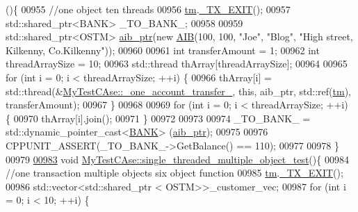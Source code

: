 \begin{DoxyCode}
      ()\{
00955     \textcolor{comment}{//one object ten threads}
00956     \hyperlink{class_my_test_c_ase_a422e6e5d4ddedea384be96031c89b72b_a422e6e5d4ddedea384be96031c89b72b}{tm}.\hyperlink{class_t_m_a5e2d1127f2429f2f524d25f430eade06_a5e2d1127f2429f2f524d25f430eade06}{\_TX\_EXIT}();
00957     std::shared\_ptr<BANK> \_TO\_BANK\_;
00958     
00959     std::shared\_ptr<OSTM> \hyperlink{class_my_test_c_ase_adad50e8278b64aa0321000b528e5362c_adad50e8278b64aa0321000b528e5362c}{aib\_ptr}(\textcolor{keyword}{new} \hyperlink{class_a_i_b}{AIB}(100, 100, \textcolor{stringliteral}{"Joe"}, \textcolor{stringliteral}{"Blog"}, \textcolor{stringliteral}{"High street, Kilkenny,
       Co.Kilkenny"}));
00960     
00961     \textcolor{keywordtype}{int} transferAmount = 1;
00962     \textcolor{keywordtype}{int} threadArraySize = 10; 
00963     std::thread thArray[threadArraySize];
00964 
00965     \textcolor{keywordflow}{for} (\textcolor{keywordtype}{int} i = 0; i < threadArraySize; ++i) \{
00966         thArray[i] = std::thread(&\hyperlink{class_my_test_c_ase_afe25c2ed3a8ab035f472fff6575f0e48_afe25c2ed3a8ab035f472fff6575f0e48}{MyTestCAse::\_one\_account\_transfer\_}, \textcolor{keyword}{
      this}, aib\_ptr, std::ref(\hyperlink{class_my_test_c_ase_a422e6e5d4ddedea384be96031c89b72b_a422e6e5d4ddedea384be96031c89b72b}{tm}), transferAmount);
00967     \}
00968     
00969     \textcolor{keywordflow}{for} (\textcolor{keywordtype}{int} i = 0; i < threadArraySize; ++i) \{
00970         thArray[i].join();
00971     \}
00972     
00973 
00974     \_TO\_BANK\_ = std::dynamic\_pointer\_cast<\hyperlink{class_b_a_n_k}{BANK}> (\hyperlink{class_my_test_c_ase_adad50e8278b64aa0321000b528e5362c_adad50e8278b64aa0321000b528e5362c}{aib\_ptr});
00975     
00976     CPPUNIT\_ASSERT(\_TO\_BANK\_->GetBalance() == 110);
00977 
00978 \}
00979 
\hypertarget{_my_test_c_ase_8cpp_source.tex_l00983}{}\hyperlink{class_my_test_c_ase_a2f75b781b07bdbc3649c10d6845cb3cc_a2f75b781b07bdbc3649c10d6845cb3cc}{00983} \textcolor{keywordtype}{void} \hyperlink{class_my_test_c_ase_a2f75b781b07bdbc3649c10d6845cb3cc_a2f75b781b07bdbc3649c10d6845cb3cc}{MyTestCAse::single\_threaded\_multiple\_object\_test}()\{
00984     \textcolor{comment}{//one transaction multiple objects six object function}
00985     \hyperlink{class_my_test_c_ase_a422e6e5d4ddedea384be96031c89b72b_a422e6e5d4ddedea384be96031c89b72b}{tm}.\hyperlink{class_t_m_a5e2d1127f2429f2f524d25f430eade06_a5e2d1127f2429f2f524d25f430eade06}{\_TX\_EXIT}();
00986     std::vector<std::shared\_ptr < OSTM>>\_customer\_vec; 
00987      \textcolor{keywordflow}{for} (\textcolor{keywordtype}{int} i = 0; i < 10; ++i) \{

\end{DoxyCode}

